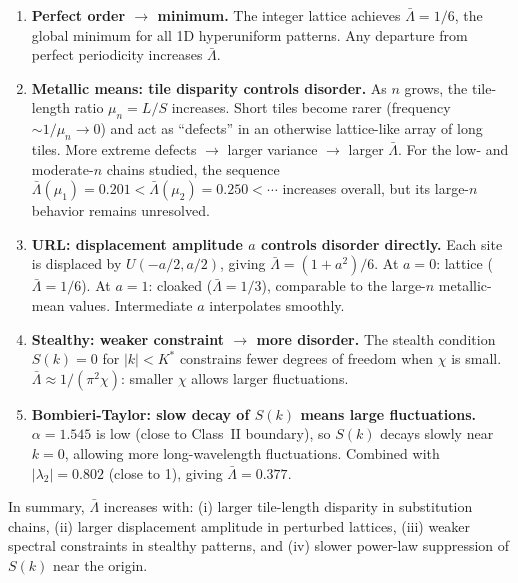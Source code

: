 \documentclass[11pt,letterpaper]{article}
\begin{document}
\begin{enumerate}[noitemsep]
  \item \textbf{Perfect order $\to$ minimum.} The integer lattice achieves
        $\bar\Lambda = 1/6$, the global minimum for all 1D hyperuniform patterns.
        Any departure from perfect periodicity increases $\bar\Lambda$.

  \item \textbf{Metallic means: tile disparity controls disorder.}
        As $n$ grows, the tile-length ratio $\mu_n = L/S$ increases.
        Short tiles become rarer (frequency $\sim 1/\mu_n \to 0$) and act as
        ``defects'' in an otherwise lattice-like array of long tiles.
        More extreme defects $\to$ larger variance $\to$ larger $\bar\Lambda$.
        For the low- and moderate-$n$ chains studied, the sequence
        $\bar\Lambda(\mu_1) = 0.201 < \bar\Lambda(\mu_2) = 0.250 < \cdots$
        increases overall, but its large-$n$ behavior remains unresolved.

  \item \textbf{URL: displacement amplitude $a$ controls disorder directly.}
        Each site is displaced by $U(-a/2, a/2)$, giving
        $\bar\Lambda = (1+a^2)/6$.
        At $a = 0$: lattice ($\bar\Lambda = 1/6$).
        At $a = 1$: cloaked ($\bar\Lambda = 1/3$), comparable to the large-$n$
        metallic-mean values.
        Intermediate $a$ interpolates smoothly.

  \item \textbf{Stealthy: weaker constraint $\to$ more disorder.}
        The stealth condition $S(k) = 0$ for $|k| < K^*$ constrains fewer
        degrees of freedom when $\chi$ is small.
        $\bar\Lambda \approx 1/(\pi^2\chi)$: smaller $\chi$ allows larger fluctuations.

  \item \textbf{Bombieri-Taylor: slow decay of $S(k)$ means large fluctuations.}
        $\alpha = 1.545$ is low (close to Class~II boundary), so
        $S(k)$ decays slowly near $k = 0$, allowing more long-wavelength
        fluctuations. Combined with $|\lambda_2| = 0.802$ (close to 1),
        giving $\bar\Lambda = 0.377$.
\end{enumerate}

\noindent In summary, $\bar\Lambda$ increases with: (i) larger tile-length disparity
in substitution chains, (ii) larger displacement amplitude in perturbed lattices,
(iii) weaker spectral constraints in stealthy patterns, and (iv) slower power-law
suppression of $S(k)$ near the origin.
\end{document}
